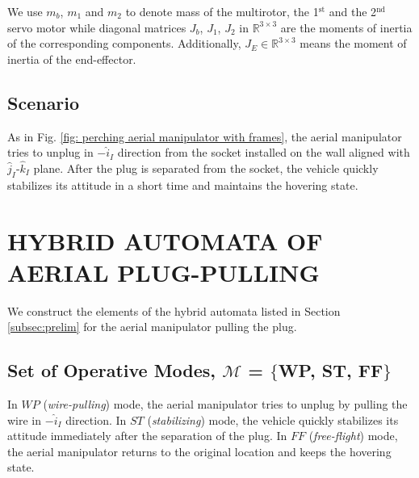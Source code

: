 \documentclass[letterpaper, 10 pt, conference]{ieeeconf}  %
\theoremstyle{definition}
\begin{document}
We use $m_b$, $m_1$ and $m_2$ to denote mass of the multirotor, the 1$^{\textrm{st}}$ and the 2$^{\textrm{nd}}$ servo motor while diagonal matrices $J_b$, $J_1$, $J_2$ in $\mathbb{R}^{3 \times 3}$ are the moments of inertia of the corresponding components. Additionally, $J_E \in \mathbb{R}^{3 \times 3}$ means the moment of inertia of the end-effector.  

\subsection{Scenario}
As in Fig. \ref{fig: perching aerial manipulator with frames}, the aerial manipulator tries to unplug in $-\hat{i}_I$ direction from the socket installed on the wall aligned with $\hat{j}_I$-$\hat{k}_I$ plane. After the plug is separated from the socket, the vehicle quickly stabilizes its attitude in a short time and maintains the hovering state.

\section{HYBRID AUTOMATA OF AERIAL PLUG-PULLING}
We construct the elements of the hybrid automata listed in Section \ref{subsec:prelim} for the aerial manipulator pulling the plug.
\subsection{Set of Operative Modes, $\mathcal{M}$ = $ \{$WP, ST, FF$\}$}
In $WP$ (\textit{wire-pulling}) mode, the aerial manipulator tries to unplug by pulling the wire in $-\hat{i}_I$ direction. In $ST$ (\textit{stabilizing}) mode, the vehicle quickly stabilizes its attitude immediately after the separation of the plug. In $FF$ (\textit{free-flight}) mode, the aerial manipulator returns to the original location and keeps the hovering state.

\end{document}
